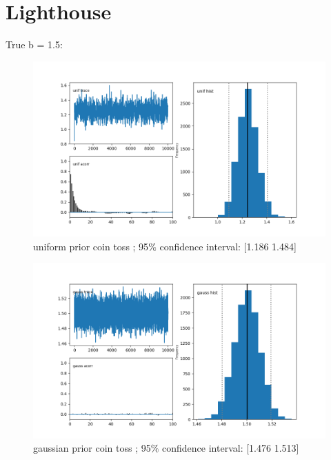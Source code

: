 \documentclass[a4paper,11pt,english]{article}
\begin{document}
\section{Lighthouse}
\par True b = 1.5:
\begin{figure}[H]
	
	\includegraphics[width=\linewidth]{lighthouse/b_unif}
	uniform prior coin toss ;   95$\%$ confidence interval: [1.186 1.484]
	
	\includegraphics[width=\linewidth]{lighthouse/b_gauss}
	gaussian prior coin toss ;  95$\%$ confidence interval: 
	[1.476 1.513]
	
\end{figure}
\end{document}
